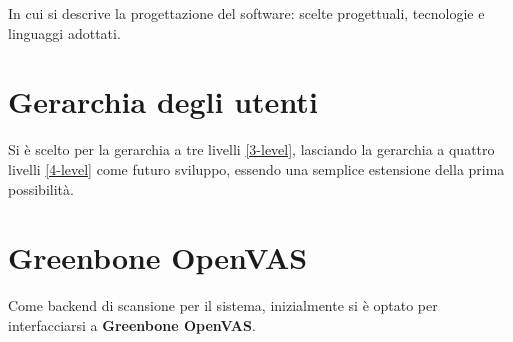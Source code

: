In cui si descrive la progettazione del software: scelte progettuali, tecnologie e linguaggi adottati.

\section{Gerarchia degli utenti}
Si è scelto per la gerarchia a tre livelli \ref{3-level}, lasciando la gerarchia a quattro livelli \ref{4-level} come futuro sviluppo, essendo una semplice estensione della prima possibilità.

\section{Greenbone OpenVAS}
Come backend di scansione per il sistema, inizialmente si è optato per interfacciarsi a \textbf{Greenbone OpenVAS}.